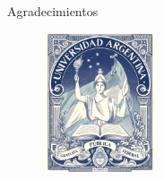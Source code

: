 \documentclass[12pt,screen,twoside]{ibtesis}
\begin{document}
\begin{postliminary}
\begin{seccion}{Agradecimientos}
\begin{figure}[H]
 \centering
    \includegraphics[width=0.3\textwidth]{figures/universidad.jpeg}
\end{figure}


\end{seccion}

\end{postliminary}
\end{document}
